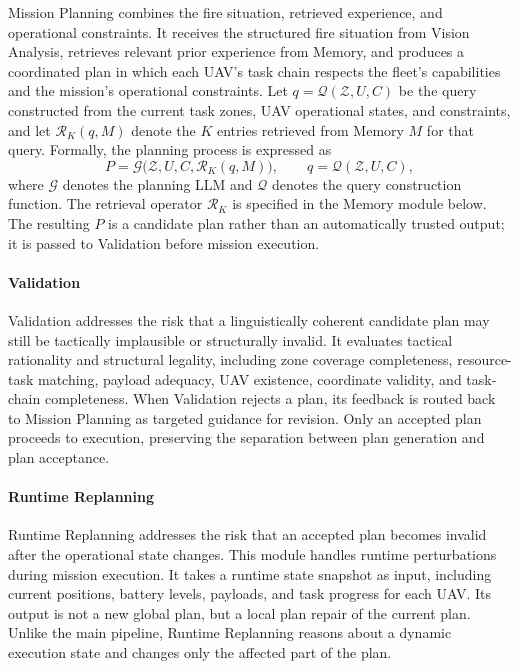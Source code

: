 Mission Planning combines the fire situation, retrieved experience,
and operational constraints.
It receives the structured fire situation from Vision Analysis,
retrieves relevant prior experience from Memory,
and produces a coordinated plan in which each UAV's task chain respects
the fleet's capabilities and the mission's operational constraints.
Let $q=\mathcal{Q}(\mathcal{Z},U,C)$ be the query constructed from the current
task zones, UAV operational states, and constraints, and let $\mathcal{R}_K(q,M)$ denote
the $K$ entries retrieved from Memory $M$ for that query. Formally, the planning
process is expressed as
\begin{equation}
P=\mathcal{G}\bigl(\mathcal{Z},U,C,\mathcal{R}_K(q,M)\bigr),
\qquad q=\mathcal{Q}(\mathcal{Z},U,C),
\label{eq:memory-augmented-planning}
\end{equation}
where $\mathcal{G}$ denotes the planning LLM and $\mathcal{Q}$ denotes the query
construction function. The retrieval operator $\mathcal{R}_K$ is specified in
the Memory module below.
The resulting $P$ is a candidate plan rather than an automatically trusted
output; it is passed to Validation before mission execution.

\paragraph{Validation} Validation addresses the risk that a linguistically
coherent candidate plan may still be tactically implausible or structurally
invalid. It evaluates tactical rationality and structural legality, including
zone coverage completeness, resource-task matching, payload adequacy, UAV
existence, coordinate validity, and task-chain completeness. When Validation
rejects a plan, its feedback is routed back to Mission Planning as targeted
guidance for revision. Only an accepted plan proceeds to execution, preserving
the separation between plan generation and plan acceptance.


\paragraph{Runtime Replanning} Runtime Replanning addresses the risk that an
accepted plan becomes invalid after the operational state changes. This module
handles runtime perturbations during mission execution.
It takes a runtime state snapshot as input, including current positions, battery levels,
payloads, and task progress for each UAV.
Its output is not a new global plan, but a local plan repair of the current plan.
Unlike the main pipeline, Runtime Replanning reasons about a dynamic execution state and
changes only the affected part of the plan.

